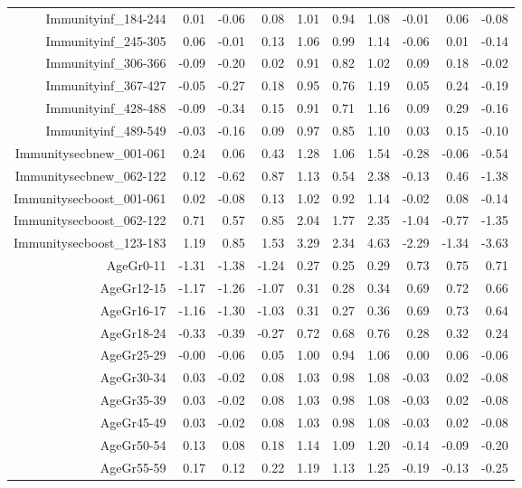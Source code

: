\begin{table}[ht]
\begin{tabular}{rrrrrrrrrr}
  Immunityinf\_184-244 & 0.01 & -0.06 & 0.08 & 1.01 & 0.94 & 1.08 & -0.01 & 0.06 & -0.08 \\ 
  Immunityinf\_245-305 & 0.06 & -0.01 & 0.13 & 1.06 & 0.99 & 1.14 & -0.06 & 0.01 & -0.14 \\ 
  Immunityinf\_306-366 & -0.09 & -0.20 & 0.02 & 0.91 & 0.82 & 1.02 & 0.09 & 0.18 & -0.02 \\ 
  Immunityinf\_367-427 & -0.05 & -0.27 & 0.18 & 0.95 & 0.76 & 1.19 & 0.05 & 0.24 & -0.19 \\ 
  Immunityinf\_428-488 & -0.09 & -0.34 & 0.15 & 0.91 & 0.71 & 1.16 & 0.09 & 0.29 & -0.16 \\ 
  Immunityinf\_489-549 & -0.03 & -0.16 & 0.09 & 0.97 & 0.85 & 1.10 & 0.03 & 0.15 & -0.10 \\ 
  Immunitysecbnew\_001-061 & 0.24 & 0.06 & 0.43 & 1.28 & 1.06 & 1.54 & -0.28 & -0.06 & -0.54 \\ 
  Immunitysecbnew\_062-122 & 0.12 & -0.62 & 0.87 & 1.13 & 0.54 & 2.38 & -0.13 & 0.46 & -1.38 \\ 
  Immunitysecboost\_001-061 & 0.02 & -0.08 & 0.13 & 1.02 & 0.92 & 1.14 & -0.02 & 0.08 & -0.14 \\ 
  Immunitysecboost\_062-122 & 0.71 & 0.57 & 0.85 & 2.04 & 1.77 & 2.35 & -1.04 & -0.77 & -1.35 \\ 
  Immunitysecboost\_123-183 & 1.19 & 0.85 & 1.53 & 3.29 & 2.34 & 4.63 & -2.29 & -1.34 & -3.63 \\ 
  AgeGr0-11 & -1.31 & -1.38 & -1.24 & 0.27 & 0.25 & 0.29 & 0.73 & 0.75 & 0.71 \\ 
  AgeGr12-15 & -1.17 & -1.26 & -1.07 & 0.31 & 0.28 & 0.34 & 0.69 & 0.72 & 0.66 \\ 
  AgeGr16-17 & -1.16 & -1.30 & -1.03 & 0.31 & 0.27 & 0.36 & 0.69 & 0.73 & 0.64 \\ 
  AgeGr18-24 & -0.33 & -0.39 & -0.27 & 0.72 & 0.68 & 0.76 & 0.28 & 0.32 & 0.24 \\ 
  AgeGr25-29 & -0.00 & -0.06 & 0.05 & 1.00 & 0.94 & 1.06 & 0.00 & 0.06 & -0.06 \\ 
  AgeGr30-34 & 0.03 & -0.02 & 0.08 & 1.03 & 0.98 & 1.08 & -0.03 & 0.02 & -0.08 \\ 
  AgeGr35-39 & 0.03 & -0.02 & 0.08 & 1.03 & 0.98 & 1.08 & -0.03 & 0.02 & -0.08 \\ 
  AgeGr45-49 & 0.03 & -0.02 & 0.08 & 1.03 & 0.98 & 1.08 & -0.03 & 0.02 & -0.08 \\ 
  AgeGr50-54 & 0.13 & 0.08 & 0.18 & 1.14 & 1.09 & 1.20 & -0.14 & -0.09 & -0.20 \\ 
  AgeGr55-59 & 0.17 & 0.12 & 0.22 & 1.19 & 1.13 & 1.25 & -0.19 & -0.13 & -0.25 \\ 

\end{tabular}
\end{table}
